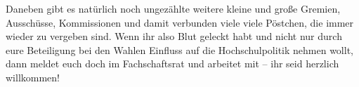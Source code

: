 \begin{multicols}{2}
		Daneben gibt es natürlich noch ungezählte weitere kleine und große Gremien, Ausschüsse, Kommissionen und damit verbunden viele viele Pöstchen, die immer wieder zu vergeben sind. Wenn ihr also Blut geleckt habt und nicht nur durch eure Beteiligung bei den Wahlen Einfluss auf die Hochschulpolitik nehmen wollt, dann meldet euch doch im Fachschaftsrat und arbeitet mit -- ihr seid herzlich willkommen!
\end{multicols}